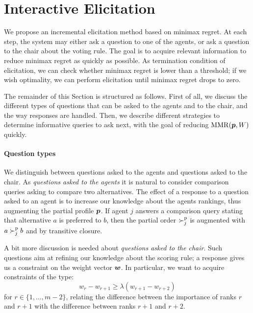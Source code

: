 \section{Interactive Elicitation} 
\label{sec:elicit}
We propose an incremental elicitation method based on minimax regret.
At each step, the system may either ask a question to one of the agents, or ask a question to the chair about the voting rule. 
The goal is to acquire relevant information to reduce minimax regret as quickly as possible.
As termination condition of elicitation, we can check whether minimax regret is lower than a threshold; if we wish optimality, we can perform elicitation until minimax regret drops to zero.

The remainder of this Section is structured as follows.
First of all, we discuss the different types of questions that can be asked to the agents and to the chair, and the way responses are handled.
Then, we describe different strategies to determine informative queries to ask next, with the goal of reducing $\operatorname{MMR}({\bm{p}},W)$ quickly.

\paragraph{Question types}
We distinguish between questions asked to the agents and questions asked to the chair.
As {\em questions asked to the agents} it is natural to consider comparison queries asking to compare two alternatives.
The effect of a response to a question asked to an agent is to increase our knowledge about the agents rankings, thus augmenting the partial profile ${\bm{p}}$. 
If agent $j$ answers a comparison query stating that alternative $a$ is preferred to $b$, then the partial order $\succ^\text{p}_j$ is augmented with $a \succ^\text{p}_j b$ and by transitive closure.

A bit more discussion is needed about {\em questions asked to the chair}.
Such questions aim at refining our knowledge about the scoring rule; a response gives us a constraint on the weight vector $\bm{w}$.
In particular, we want to acquire constraints of the type:
\[ w_{r} - w_{r+1} \geq \lambda (w_{r+1} - w_{r+2}) \] 
for $r \in \{1,\ldots,m-2\}$, relating the difference between the importance of ranks $r$ and $r+1$ with the difference between ranks $r+1$ and $r+2$.

